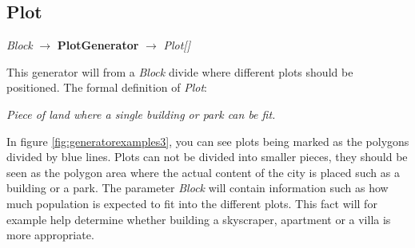 \subsection{Plot}
\begin{center}
    \textit{Block} $\rightarrow$ \textbf{PlotGenerator} $\rightarrow$ \textit{Plot{[}{]}}
\end{center}
This generator will from a \textit{Block} divide where different plots should be positioned. 
The formal definition of \textit{Plot}:
\begin{center}
    \textit{Piece of land where a single building or park can be fit.}
\end{center}
In figure \ref{fig:generatorexamples3}, you can see plots being marked as the polygons divided by blue lines. 
Plots can not be divided into smaller pieces, they should be seen as the polygon area where the actual content of the city is placed such as a building or a park.
The parameter \textit{Block} will contain information such as how much population is expected to fit into the different plots. 
This fact will for example help determine whether building a skyscraper, apartment or a villa is more appropriate.